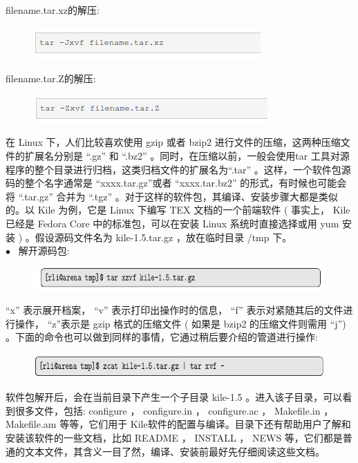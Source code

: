 \documentclass[12pt，a4paper]{article}
\numberwithin{equation}{section}
\begin{document}
filename.tar.xz的解压: 
\begin{figure}[H]
\centering
\includegraphics[scale=0.6]{./figures/288.png}
\end{figure}
filename.tar.Z的解压: 
\begin{figure}[H]
\centering
\includegraphics[scale=0.6]{./figures/289.png}
\end{figure}


在 Linux 下，人们比较喜欢使用 gzip 或者 bzip2 进行文件的压缩，这两种压缩文件的扩展名分别是 “.gz” 和 “.bz2” 。同时，在压缩以前，一般会使用tar 工具对源程序的整个目录进行归档，这类归档文件的扩展名为“.tar” 。这样，一个软件包源码的整个名字通常是 “xxxx.tar.gz”或者 “xxxx.tar.bz2” 的形式，有时候也可能会将 “.tar.gz” 合并为 “.tgz” 。对于这样的软件包，其编译、安装步骤大都是类似的。以 Kile 为例，它是 Linux 下编写 TEX 文档的一个前端软件 ( 事实上， Kile 已经是 Fedora Core 中的标准包，可以在安装 Linux 系统时直接选择或用 yum 安装 ) 。假设源码文件名为 kile-1.5.tar.gz ，放在临时目录 /tmp 下。\\
$\bullet$~ 解开源码包:
\begin{figure}[H]
\centering
\includegraphics[scale=0.6]{./figures/266.png}
\end{figure}
“x” 表示展开档案， “v” 表示打印出操作时的信息， “f” 表示对紧随其后的文件进行操作， “z”表示是 gzip 格式的压缩文件 ( 如果是 bzip2 的压缩文件则需用 “j”) 。下面的命令也可以做到同样的事情，它通过稍后要介绍的管道进行操作:
\begin{figure}[H]
\centering
\includegraphics[scale=0.6]{./figures/210.png}
\end{figure}
软件包解开后，会在当前目录下产生一个子目录 kile-1.5 。进入该子目录，可以看到很多文件，包括: configure ， configure.in ，
configure.ac ， Makefile.in ， Makefile.am 等等，它们用于 Kile软件的配置与编译。目录下还有帮助用户了解和安装该软件的一些文档，比如 README ， INSTALL ， NEWS 等，它们都是普通的文本文件，其含义一目了然，编译、安装前最好先仔细阅读这些文档。\\
\end{document}
